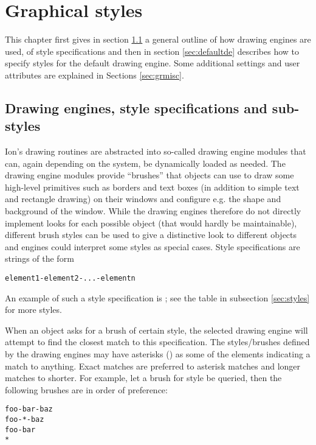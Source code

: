 
\chapter{Graphical styles}
\label{chap:gr}

This chapter first gives in section \ref{sec:engines} a general outline 
of how drawing engines are used, of style specifications and then
in section \ref{sec:defaultde} describes how to specify styles
for the default drawing engine. Some additional settings and
user attributes are explained in Sections \ref{sec:grmisc}.


\section{Drawing engines, style specifications and sub-styles}
\label{sec:engines}

Ion's drawing routines are abstracted into so-called drawing engine
modules that can, again depending on the system, be dynamically
loaded as needed. The drawing engine modules provide ``brushes''
that objects can use to draw some high-level primitives such
as borders and text boxes (in addition to simple text and rectangle
drawing) on their windows and configure e.g. the shape and 
background of the window. While the drawing engines therefore
do not directly implement looks for each possible object (that
would hardly be maintainable), different brush styles can be
used to give a distinctive look to different objects and engines
could interpret some styles as special cases. Style specifications 
are strings of the form

\begin{verbatim}
element1-element2-...-elementn
\end{verbatim}

An example of such a style specification is ;
see the table in subsection \ref{sec:styles} for more styles.

When an object asks for a brush of certain style, the selected
drawing engine will attempt to find the closest match to this
specification. The styles/brushes defined by the drawing engines 
may have asterisks (\codestr{*}) as some of the elements indicating
a match to anything. Exact matches are preferred to asterisk
matches and longer matches to shorter. For example, let a brush
for style  be queried, then the following
brushes are in order of preference:

\begin{verbatim}
foo-bar-baz
foo-*-baz
foo-bar
*
\end{verbatim}

